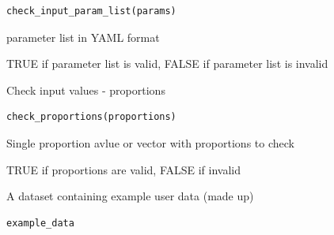 \documentclass[a4paper]{book}
\begin{document}
%
\begin{Usage}
\begin{verbatim}
check_input_param_list(params)
\end{verbatim}
\end{Usage}
%
\begin{Arguments}
\begin{ldescription}
\item[\code{params}] parameter list in YAML format
\end{ldescription}
\end{Arguments}
%
\begin{Value}
TRUE if parameter list is valid, FALSE if parameter list is invalid
\end{Value}
%
\begin{Description}
Check input values - proportions
\end{Description}
%
\begin{Usage}
\begin{verbatim}
check_proportions(proportions)
\end{verbatim}
\end{Usage}
%
\begin{Arguments}
\begin{ldescription}
\item[\code{proportions}] Single proportion avlue or vector with proportions to check
\end{ldescription}
\end{Arguments}
%
\begin{Value}
TRUE if proportions are valid, FALSE if invalid
\end{Value}
%
\begin{Description}
A dataset containing example user data (made up)
\end{Description}
%
\begin{Usage}
\begin{verbatim}
example_data
\end{verbatim}
\end{Usage}
%
\end{document}
